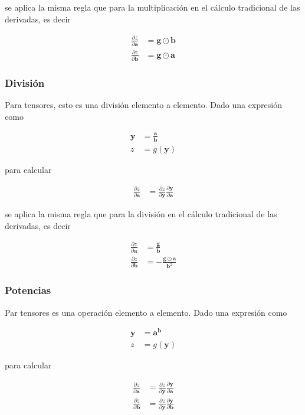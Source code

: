 \documentclass{article}
\begin{document}
se aplica la misma regla que para la multiplicación en el cálculo tradicional de las derivadas, es decir

\begin{align*}
	\frac{\partial z}{\partial \bm{a}} &= \bm{g} \odot \bm{b} \\
	\frac{\partial z}{\partial \bm{b}} &= \bm{g} \odot \bm{a}
\end{align*}

\newpage

\subsubsection*{División}

Para tensores, esto es una división elemento a elemento.
Dado una expresión como

\begin{align*}
	\bm{y} &= \frac{\bm{a}}{\bm{b}} \\
	z &= g(\bm{y})
\end{align*}

para calcular

\begin{align*}
	\frac{\partial z}{\partial \bm{a}} &= \frac{\partial z}{\partial \bm{y}} \frac{\partial \bm{y}}{\partial \bm{a}}
\end{align*}

se aplica la misma regla que para la división en el cálculo tradicional de las derivadas, es decir

\begin{align*}
	\frac{\partial z}{\partial \bm{a}} &= \frac{\bm{g}}{\bm{b}} \\
	\frac{\partial z}{\partial \bm{b}} &= -\frac{\bm{g} \odot \bm{a}}{\bm{b}^2}
\end{align*}

\subsubsection*{Potencias}

Par tensores es una operación elemento a elemento. Dado una expresión como

\begin{align*}
	\bm{y} &= \bm{a}^{\bm{b}} \\
	z &= g(\bm{y})
\end{align*}

para calcular

\begin{align*}
	\frac{\partial z}{\partial \bm{a}} &= \frac{\partial z}{\partial \bm{y}} \frac{\partial \bm{y}}{\partial \bm{a}} \\
	\frac{\partial z}{\partial \bm{b}} &= \frac{\partial z}{\partial \bm{y}} \frac{\partial \bm{y}}{\partial \bm{b}}
\end{align*}
\end{document}
